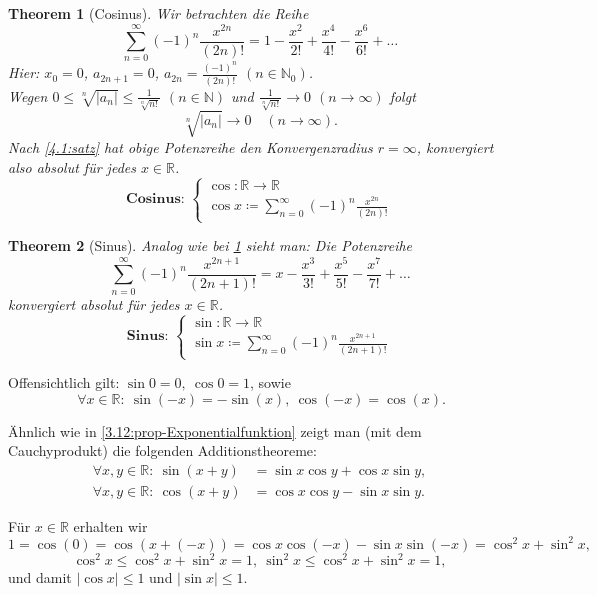 \documentclass[12pt]{extreport} %
\newcommand{\N}{\mathbb{N}}
\newcommand{\R}{\mathbb{R}}
\theoremstyle{named}
\newtheorem{unnamedtheorem}{Theorem} \counterwithin{unnamedtheorem}{chapter}
\theoremstyle{itshape}
\theoremstyle{normal}
\begin{document}
\begin{unnamedtheorem}[Cosinus] \label{4.3:prop-Cosinus}
	Wir betrachten die Reihe
	$$ \sum_{n=0}^{\infty} (-1)^{n} \frac{x^{2n}}{(2n)!} = 1 - \frac{x^{2}}{2!} + \frac{x^{4}}{4!} - \frac{x^{6}}{6!} + \dotsc $$
	Hier: $x_{0} = 0$, $a_{2n + 1} = 0$, $a_{2n} = \frac{(-1)^{n}}{(2n)!}$ $(n \in \N_0)$. \\
	Wegen $0 \le \sqrt[n]{|a_{n}|} \leq \frac{1}{\sqrt[n]{n!}}$ $(n \in \N)$ und
	$\frac{1}{\sqrt[n]{n!}} \to 0$ $(n \to \infty)$ folgt
	$$ \sqrt[n]{|a_{n}|}  \rightarrow 0 \quad (n \to \infty). $$ 
	Nach \ref{4.1:satz} hat obige Potenzreihe den Konvergenzradius $r = \infty$, konvergiert also absolut für jedes $x \in \R$.
	$$ \textbf{Cosinus: } \begin{cases} \cos \colon \R \rightarrow \R \\ \cos x \coloneqq \sum_{n=0}^{\infty} (-1)^{n} \frac{x^{2n}}{(2n)!} \end{cases} $$
\end{unnamedtheorem}

\begin{unnamedtheorem}[Sinus] \label{4.4:prop-Sinus}
	Analog wie bei \ref{4.3:prop-Cosinus} sieht man: Die Potenzreihe 
	$$ \sum_{n=0}^{\infty} (-1)^{n} \frac{x^{2n+1}}{(2n+1)!} = x - \frac{x^{3}}{3!} + \frac{x^{5}}{5!} - \frac{x^{7}}{7!} + \dotsc $$
	konvergiert absolut für jedes $x \in \R$.
	$$ \textbf{Sinus: } \begin{cases} \sin \colon \R \rightarrow \R \\ \sin x \coloneqq \sum_{n=0}^{\infty} (-1)^{n} \frac{x^{2n+1}}{(2n+1)!} \end{cases} $$	
\end{unnamedtheorem}

Offensichtlich gilt: $\sin 0 = 0, ~ \cos 0 = 1$, sowie
$$~\forall x \in \R: ~ \sin (-x) = - \sin(x), ~ \cos(-x) = \cos(x).$$

Ähnlich wie in \ref{3.12:prop-Exponentialfunktion} zeigt man (mit dem Cauchyprodukt) die folgenden Additionstheoreme:
\begin{align*}
	\forall x,y \in \R: ~ \sin(x+y) & = \sin x \cos y + \cos x \sin y, \\
	\forall x,y \in \R: ~ \cos(x+y) & = \cos x \cos y - \sin x \sin y.
\end{align*}

Für $x \in \R$ erhalten wir
	$$ 1 = \cos(0) = \cos( x + (-x) )= \cos x \cos(-x) - \sin x \sin(-x) = \cos^{2} x + \sin^{2} x, $$
        $$\cos^{2} x \leq \cos^{2} x + \sin^{2} x = 1, ~ \sin^{2} x \leq \cos^{2} x + \sin^{2} x = 1,$$
        und damit $|\cos x | \leq 1$ und $|\sin x | \leq 1$.
\end{document}
